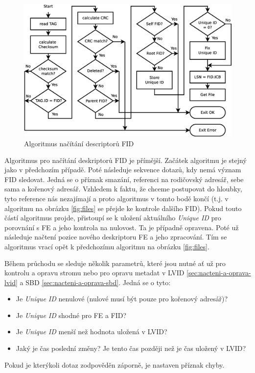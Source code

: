\begin{figure}[] 
    \centering
    \includegraphics[scale=0.36]{obrazky/inspect-fid.eps}
    \caption{Algoritmus načítání descriptorů FID}
    \label{fig:fid}
\end{figure}
Algoritmus pro načítání deskriptorů FID je přímější. Začátek algoritmu je stejný jako v předchozím případě. Poté následuje sekvence dotazů, kdy nemá význam FID sledovat. Jedná se o příznak smazání, referenci na rodičovský adresář, sebe sama a kořenový adresář. Vzhledem k faktu, že chceme postupovat do hloubky, tyto reference nás nezajímají a proto algoritmus v tomto bodě končí (t.j. v algoritmu na obrázku \ref{fig:files} se přejde ke kontrole dalšího FID). Pokud touto částí algoritmus projde, přistoupí se k uložení aktuálního \textit{Unique ID} pro porovnání s FE a jeho kontrola na nulovost. Ta je případně opravena. Poté už následuje načtení pozice nového deskriptoru FE a jeho zpracování. Tím se algoritmus vrací opět k předchozímu algoritmu na obrázku \ref{fig:files}.

Během průchodu se sleduje několik parametrů, které jsou nutné ať už pro kontrolu a opravu stromu nebo pro opravu metadat v LVID \ref{sec:nacteni-a-oprava-lvid} a SBD \ref{sec:nacteni-a-oprava-sbd}. Jedná se o tyto:
\begin{itemize}
    \item Je \textit{Unique ID} nenulové (nulové musí být pouze pro kořenový adresář)?
    \item Je \textit{Unique ID} shodné pro FE a FID?
    \item Je \textit{Unique ID} menší než hodnota uložená v LVID?
    \item Jaký je čas poslední změny? Je tento čas později než je čas uložený v LVID? 
\end{itemize}
Pokud je kterýkoli dotaz zodpověděn záporně, je nastaven příznak chyby.

